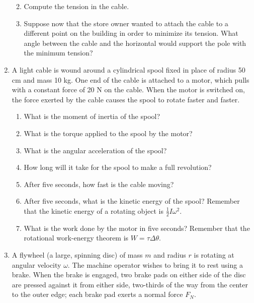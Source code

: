 \documentclass[12pt]{article}
\begin{document}
\begin{enumerate}
\begin{enumerate}
\bigskip

\item Compute the tension in the cable.

\vspace{2 in}

\item Suppose now that the store owner wanted to attach the cable to a different point on the building in order to minimize its tension. What angle between the
cable and the horizontal would support the pole with the minimum tension?
\end{enumerate}
\newpage


  \item{A light cable is wound around a cylindrical spool fixed in place of radius 50 cm and mass 10 kg. One end of the cable is attached to a motor, which pulls with a constant force of 20 N on the cable. When the motor is switched on, the force exerted by the cable causes the spool to rotate faster and faster.}
    \begin{enumerate}
      \item{What is the moment of inertia of the spool?}
\vspace{0.9in}
      \item{What is the torque applied to the spool by the motor?}
\vspace{0.9in}
      \item{What is the angular acceleration of the spool?}
\vspace{0.9in}
      \item{How long will it take for the spool to make a full revolution?}
\vspace{0.9in}
      \item{After five seconds, how fast is the cable moving?}
\vspace{0.9in}
      \item{After five seconds, what is the kinetic energy of the spool? Remember that the kinetic energy
of a rotating object is $\frac{1}{2}I\omega^2$.}
\vspace{0.9in}
      \item{What is the work done by the motor in five seconds? Remember that the rotational work-energy
theorem is $W=\tau \Delta \theta$.}
\vspace{0.9in}
     \end{enumerate}

\newpage

\item A flywheel (a large, spinning disc) of mass $m$ and radius $r$ is rotating
at angular velocity $\omega$. The machine operator wishes to bring it to rest using a brake. When the brake 
is engaged, two brake pads on either side of the disc are pressed against it from either side, two-thirds
of the way from the center to the outer edge; each brake pad
exerts a normal force $F_N$. 


\end{enumerate}
\end{document}
